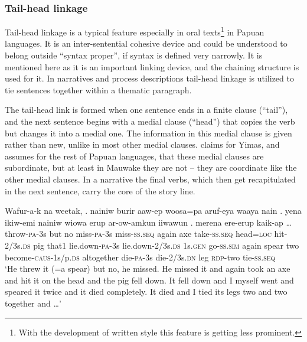 \subsubsection{Tail-head linkage} \label{sec:8.2.3.5}

Tail-head linkage is a typical feature especially in oral texts\footnote{With the development of written style this feature is getting less prominent.}  in Papuan languages. It is an inter-sentential cohesive device and could be understood to belong outside ``syntax proper'', if syntax is defined very narrowly. It is mentioned here as it is an important linking device, and the chaining structure is used for it. In narratives and process descriptions tail-head linkage is utilized to tie sentences together within a thematic paragraph. 

 The tail-head link is formed when one sentence ends in a finite clause (``tail''), and the next sentence begins with a medial clause (``head'') that copies the verb but changes it into a medial one. The information in this medial clause is given rather than new, unlike in most other medial clauses. \citet[200--201]{Foley1986} claims for Yimas, and assumes for the rest of Papuan languages, that these medial clauses are subordinate, but at least in Mauwake they are not -- they are coordinate like the other medial clauses. In a narrative the final verbs, which then get recapitulated in the next sentence, carry the core of the story line.

\ea%
\label{ex:8:x1505}
\gll Wafur-a-k  na  weetak,  .   nainiw  burir  aaw-ep  woosa=pa  aruf-eya  waaya nain  .    yena  ikiw-emi  nainiw wiowa  erup  ar-ow-amkun  iiwawun  .   merena  ere-erup  kaik-ap  {\dots}\\
throw-\textsc{pa}-3s  but  no  miss-\textsc{pa}-3s  miss-\textsc{ss}.\textsc{seq} again  axe  take-\textsc{ss}.\textsc{seq} head=\textsc{loc} hit-2/3s.\textsc{ds} pig that1 lie.down-\textsc{pa}-3s lie.down-2/3s.\textsc{ds} 1s.\textsc{gen} go-\textsc{ss}.\textsc{sim} again spear  two  become-\textsc{caus}-1s/p.\textsc{ds} altogether die-\textsc{pa}-3s die-2/3s.\textsc{dn} leg \textsc{rdp}-two  tie-\textsc{ss}.\textsc{seq}\\
\glt`He threw it (=a spear) but no, he missed. He missed it and again took an axe and hit it on the head and the pig fell down. It fell down and I myself went and speared it twice and it died completely. It died and I tied its legs two and two together and {\dots}'
\z


